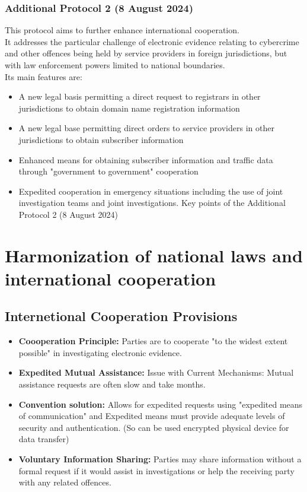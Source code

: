 \subsubsection{Additional Protocol 2 (8 August 2024)}
This protocol aims to further enhance international cooperation.\\
It addresses the particular challenge of electronic evidence relating to
cybercrime and other offences being held by service providers in
foreign jurisdictions, but with law enforcement powers limited to
national boundaries.\\
Its main features are:
\begin{itemize}[itemsep=0pt]
  \item A new legal basis permitting a direct request to registrars in other jurisdictions to obtain domain name registration information
  \item A new legal base permitting direct orders to service providers in other jurisdictions to obtain subscriber information
  \item Enhanced means for obtaining subscriber information and traffic data through "government to government" cooperation
  \item Expedited cooperation in emergency situations including the use of joint investigation teams and joint investigations. Key points of the Additional Protocol 2 (8 August 2024)
\end{itemize}

\section{Harmonization of national laws and international cooperation}

\subsection{Internetional Cooperation Provisions}
\begin{itemize}[itemsep=0pt]
  \item \textbf{Coooperation Principle:} Parties are to cooperate "to the widest extent possible" in investigating electronic evidence.
  \item \textbf{Expedited Mutual Assistance:} Issue with Current Mechanisms: Mutual assistance requests are often slow and take months.
  \item \textbf{Convention solution:} Allows for expedited requests using "expedited means of communication" and Expedited means must provide adequate levels of security and authentication. (So can be used encrypted physical device for data transfer)
  \item \textbf{Voluntary Information Sharing:} Parties may share information without a formal request if it would assist in investigations or help the receiving party with any related offences.
\end{itemize}


